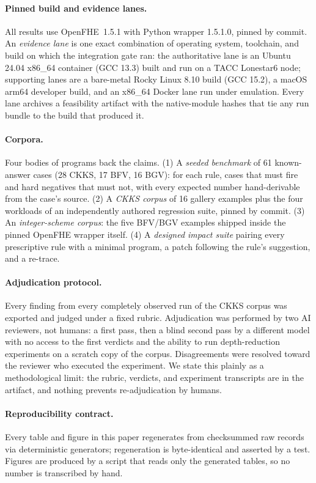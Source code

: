 \documentclass[sigconf,nonacm]{acmart}
\begin{document}
\paragraph{Pinned build and evidence lanes.} All results use OpenFHE~1.5.1
with Python wrapper 1.5.1.0, pinned by commit. An \emph{evidence lane} is
one exact combination of operating system, toolchain, and build on which the
integration gate ran: the authoritative lane is an Ubuntu 24.04 x86\_64
container (GCC 13.3) built and run on a TACC Lonestar6 node; supporting
lanes are a bare-metal Rocky Linux 8.10 build (GCC 15.2), a macOS arm64
developer build, and an x86\_64 Docker lane run under emulation. Every lane
archives a feasibility artifact with the native-module hashes that tie any
run bundle to the build that produced it.

\paragraph{Corpora.} Four bodies of programs back the claims. (1) A
\emph{seeded benchmark} of 61 known-answer cases (28 CKKS, 17 BFV, 16 BGV):
for each rule, cases that must fire and hard negatives that must not, with
every expected number hand-derivable from the case's source. (2) A
\emph{CKKS corpus} of 16 gallery examples plus the four workloads of an
independently authored regression suite, pinned by commit. (3) An
\emph{integer-scheme corpus}: the five BFV/BGV examples shipped inside the
pinned OpenFHE wrapper itself. (4) A \emph{designed impact suite} pairing
every prescriptive rule with a minimal program, a patch following the rule's
suggestion, and a re-trace.

\paragraph{Adjudication protocol.} Every finding from every completely
observed run of the CKKS corpus was exported and judged under a fixed
rubric. Adjudication was performed by two AI reviewers, not humans: a first
pass, then a blind second pass by a different model with no access to the
first verdicts and the ability to run depth-reduction experiments on a
scratch copy of the corpus. Disagreements were resolved toward the reviewer
who executed the experiment. We state this plainly as a methodological
limit: the rubric, verdicts, and experiment transcripts are in the artifact,
and nothing prevents re-adjudication by humans.

\paragraph{Reproducibility contract.} Every table and figure in this paper
regenerates from checksummed raw records via deterministic generators;
regeneration is byte-identical and asserted by a test. Figures are produced
by a script that reads only the generated tables, so no number is
transcribed by hand.
\end{document}
